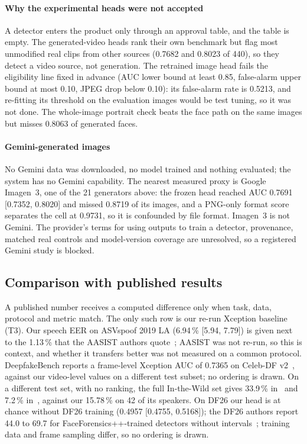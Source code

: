 \documentclass[conference,a4paper]{IEEEtran_nodash}
\begin{document}
\paragraph*{Why the experimental heads were not accepted}
A detector enters the product only through an approval table, and the table is
empty. The generated-video heads rank their own benchmark but flag most unmodified
real clips from other sources (0.7682 and 0.8023 of 440), so they detect a video
source, not generation. The retrained image head fails the eligibility line fixed
in advance (AUC lower bound at least 0.85, false-alarm upper bound at most 0.10,
JPEG drop below 0.10): its false-alarm rate is 0.5213, and re-fitting its
threshold on the evaluation images would be test tuning, so it was not done. The
whole-image portrait check beats the face path on the same images but misses 0.8063
of generated faces. %

\paragraph*{Gemini-generated images}
No Gemini data was downloaded, no model trained and nothing evaluated; the system
has no Gemini capability. The nearest measured proxy is Google Imagen~3, one of
the 21 generators above: the frozen head reached AUC 0.7691 [0.7352, 0.8020] and
missed 0.8719 of its images, and a PNG-only format score separates the cell at
0.9731, so it is confounded by file format. Imagen~3 is not Gemini. The provider's
terms for using outputs to train a detector, provenance, matched real controls and
model-version coverage are unresolved, so a registered Gemini study is
blocked. %

\subsection{Comparison with published results}\label{sec:compare}
A published number receives a computed difference only when task, data, protocol
and metric match. The only such row is our re-run Xception baseline (T3). Our
speech EER on ASVspoof 2019 LA (6.94\,\% [5.94, 7.79]) is given next to the 1.13\,\%
that the AASIST authors quote~\cite{jung2021aasist}; AASIST was not re-run, so this
is context, and whether it transfers better was not measured on a common protocol.
DeepfakeBench reports a frame-level Xception AUC of 0.7365 on Celeb-DF
v2~\cite{yan2023deepfakebench}, against our video-level values on a different
test subset; no ordering is drawn. On a different test set, with no ranking, the full In-the-Wild set gives 33.9\,\% in~\cite{muller2022inthewild} and 7.2\,\% in~\cite{pascu2024generalisable}, against our
15.78\,\% on 42 of its speakers. On DF26 our head is at chance without DF26 training
(0.4957 [0.4755, 0.5168]); the DF26 authors report 44.0 to 69.7 for
FaceForensics++-trained detectors without intervals~\cite{shykula2026df26}; training
data and frame sampling differ, so no ordering is drawn.
\end{document}

